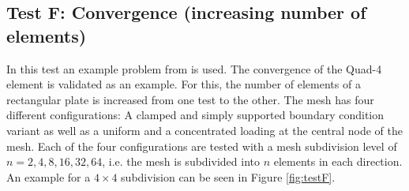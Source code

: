  \subsection{Test F: Convergence (increasing number of elements)}\label{sec:valid-F}
  In this test an example problem from \cite{macneal1985proposed} is used. The convergence of the Quad-4 element is validated as an example. For this, the number of elements of a rectangular plate is increased from one test to the other. The mesh has four different configurations: A clamped and simply supported boundary condition variant as well as a uniform and a concentrated loading at the central node of the mesh. Each of the four configurations are tested with a mesh subdivision level of $n={2,4,8,16,32,64}$, i.e. the mesh is subdivided into $n$ elements in each direction. An example for a $4\!\times\!4$ subdivision can be seen in Figure \ref{fig:testF}.
  

